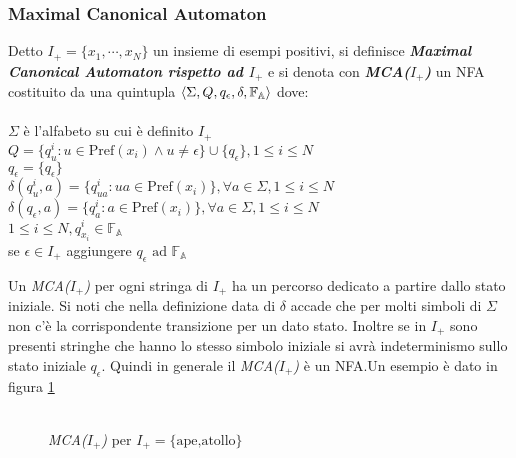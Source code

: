 \subsubsection{Maximal Canonical Automaton}
\begin{definizione}
Detto $I_+ = \{x_1,\cdots ,x_N\}$ un insieme di esempi positivi, si definisce \textit{\textbf{Maximal Canonical Automaton rispetto ad $I_+$}} e si denota con \textit{\textbf{MCA($I_+$)}} un \ac{NFA} costituito da una quintupla $\Braket{\Sigma , Q , q_\epsilon , \delta , \mathbb{F}_\mathbb{A}}$ dove:\\\\
$\Sigma$ è l'alfabeto su cui è definito $I_+$\\
$Q = \{q_{u}^{i} : u \in \text{Pref}(x_i) \land u \ne \epsilon \} \cup \{q_\epsilon\}, 1 \leq i \leq N$\\
$q_\epsilon = \{q_\epsilon\}$\\
$\delta(q_{u}^{i},a) = \{q_{ua}^{i} : ua \in \text{Pref}(x_i)\}, \forall a \in \Sigma, 1 \leq i \leq N$\\
$\delta(q_\epsilon,a) = \{q_{a}^{i} : a \in \text{Pref}(x_i)\}, \forall a \in \Sigma, 1 \leq i \leq N$\\
$1 \leq i \leq N, q_{x_{i}}^{i} \in \mathbb{F}_\mathbb{A} $\\
se $\epsilon \in I_+$ aggiungere $q_\epsilon \text{ ad } \mathbb{F}_\mathbb{A}$
\end{definizione}
Un \textit{MCA($I_+$)} per ogni stringa di $I_+$ ha un percorso dedicato a partire dallo stato iniziale.
Si noti che nella definizione data di $\delta$ accade che per molti simboli di $\Sigma$ non c'è la corrispondente transizione per un dato stato. Inoltre se in $I_+$ sono presenti stringhe che hanno lo stesso simbolo iniziale si avrà indeterminismo sullo stato iniziale $q_\epsilon$. Quindi in generale il \textit{MCA($I_+$)} è un \ac{NFA}.Un esempio è dato in figura \ref{fig:MCA}\\\\
\begin{figure}
\centering
{}
\caption[Maximal Canonical Automaton]{\textit{MCA($I_+$)} per $I_+=\{\text{ape,atollo}\}$}
\label{fig:MCA}
\end{figure}


